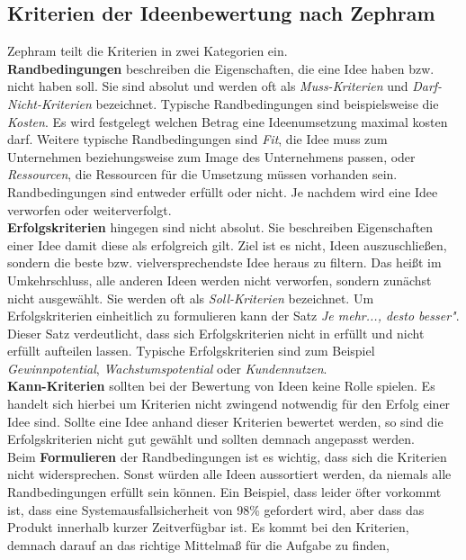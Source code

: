\subsection{Kriterien der Ideenbewertung nach Zephram}
Zephram teilt die Kriterien in zwei Kategorien ein. \\
\textbf{Randbedingungen} beschreiben die Eigenschaften, die eine Idee haben 
bzw. nicht haben soll. Sie sind absolut und werden oft als \textit{Muss-Kriterien}
und \textit{Darf-Nicht-Kriterien} bezeichnet.
Typische Randbedingungen sind beispielsweise die \textit{Kosten}. 
Es wird festgelegt welchen Betrag eine Ideenumsetzung maximal kosten darf. 
Weitere typische Randbedingungen sind \textit{Fit}, die Idee muss zum Unternehmen 
beziehungsweise zum Image des Unternehmens passen, oder \textit{Ressourcen}, die Ressourcen für die
Umsetzung müssen vorhanden sein. 
Randbedingungen sind entweder erfüllt oder nicht. Je nachdem wird eine Idee verworfen oder 
weiterverfolgt. \\
\textbf{Erfolgskriterien} hingegen sind nicht absolut. Sie beschreiben Eigenschaften einer Idee 
damit diese als erfolgreich gilt. Ziel ist es nicht, Ideen auszuschließen, sondern die beste bzw. 
vielversprechendste Idee heraus zu filtern. Das heißt im Umkehrschluss, alle anderen Ideen werden nicht 
verworfen, sondern zunächst nicht ausgewählt. Sie werden oft als \textit{Soll-Kriterien} bezeichnet. Um 
Erfolgskriterien einheitlich zu formulieren kann der Satz \textit{Je mehr..., desto besser"}.
Dieser Satz verdeutlicht, dass sich Erfolgskriterien nicht in erfüllt und nicht erfüllt aufteilen 
lassen. Typische Erfolgskriterien sind zum Beispiel \textit{Gewinnpotential}, \textit{Wachstumspotential} oder \textit{Kundennutzen}.\\
\textbf{Kann-Kriterien} sollten bei der Bewertung von Ideen keine Rolle spielen. Es handelt sich hierbei 
um Kriterien nicht zwingend notwendig für den Erfolg einer Idee sind. Sollte eine Idee anhand dieser Kriterien 
bewertet werden, so sind die Erfolgskriterien nicht gut gewählt und sollten demnach angepasst werden.\\
Beim \textbf{Formulieren} der Randbedingungen ist es wichtig, dass sich die Kriterien nicht
widersprechen. Sonst würden alle Ideen aussortiert werden, da niemals alle Randbedingungen erfüllt sein können.
Ein Beispiel, dass leider öfter vorkommt ist, dass eine Systemausfallsicherheit von 98\% gefordert wird, aber dass das Produkt innerhalb kurzer Zeitverfügbar ist. 
Es kommt bei den Kriterien, demnach darauf an das richtige Mittelmaß für die Aufgabe zu finden, 
